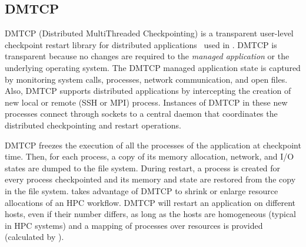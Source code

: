 \vspace{-0.4cm}
\subsection{DMTCP}

DMTCP (Distributed
MultiThreaded Checkpointing) is a transparent user-level checkpoint
restart library for distributed applications~\cite{dmtcp}
used in \systemname.
DMTCP is transparent because no changes are required to
the \textit{managed application} or the underlying operating
system. The DMTCP managed application state is captured by monitoring
system calls, processes, network communication, and open files.  Also,
DMTCP supports distributed applications by intercepting the creation
of new local or remote (SSH or MPI) process. Instances of DMTCP in
these new processes connect through sockets to a central daemon that
coordinates the distributed checkpointing and restart operations.

DMTCP freezes the execution of all the processes of the application at
checkpoint time.  Then, for each process, a copy of its memory
allocation, network, and I/O states are dumped to the file system.
During restart, a process is created for every process checkpointed and 
its memory and state are restored from the copy in the file system.
\systemname takes advantage of DMTCP to shrink or enlarge
resource allocations of an HPC workflow.
DMTCP will restart an application on different hosts, even if their
number differs, as long as the hosts are homogeneous (typical in HPC
systems) and a mapping of processes over resources is provided
(calculated by \systemname).


%
%
%
%

